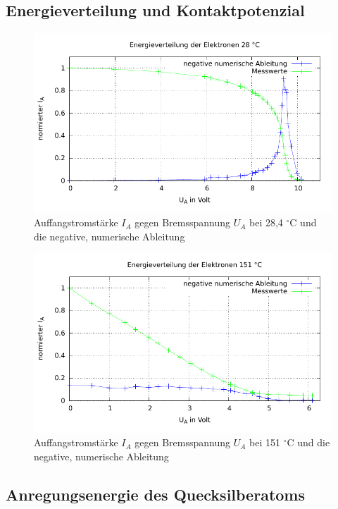 \subsection{Energieverteilung und Kontaktpotenzial}
\label{sec_energie}

\begin{figure}[H]
 \includegraphics[width=0.8 \textwidth]{pics/energie28.pdf}
 \caption{Auffangstromstärke $I_A$ gegen Bremsspannung $U_A$ bei 28,4 $^{\circ}$C und die negative, numerische Ableitung}
 \label{pic_energie28}
\end{figure}

\begin{figure}[H]
 \includegraphics[width=0.8 \textwidth]{pics/energie151.pdf}
 \caption{Auffangstromstärke $I_A$ gegen Bremsspannung $U_A$ bei 151 $^{\circ}$C und die negative, numerische Ableitung}
 \label{pic_energie151}
\end{figure}


\subsection{Anregungsenergie des Quecksilberatoms}
\label{sec_anregung}

